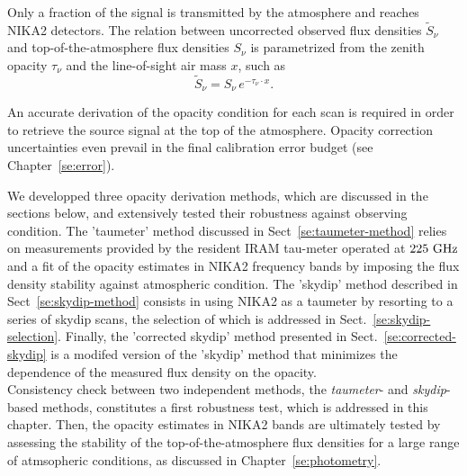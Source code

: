 %
%


Only a fraction of the signal is transmitted by the atmosphere and
reaches NIKA2 detectors. 
The relation between uncorrected observed flux densities
$\tilde{S}_{\nu}$ and top-of-the-atmosphere flux densities $S_{\nu}$
is parametrized from the zenith opacity $\tau_{\nu}$
and the line-of-sight air mass $x$, such as
\begin{equation}
\tilde{S}_{\nu} = S_{\nu} \, e^{-\tau_{\nu} \cdot x}.
\end{equation}

An accurate derivation of the opacity condition for each scan is
required in order to retrieve the source signal at the top of the
atmosphere. Opacity correction uncertainties even prevail in the
final calibration error budget (see Chapter~\ref{se:error}).

We developped three opacity derivation methods, which are discussed
in the sections below, and extensively tested their robustness against
observing condition. The 'taumeter' method discussed in
Sect~\ref{se:taumeter-method} relies on measurements provided by the
resident IRAM tau-meter operated at $225~\rm{GHz}$ and a fit of the
opacity estimates in NIKA2 frequency bands by imposing the flux
density stability against atmospheric condition. The 'skydip' method
described in Sect~\ref{se:skydip-method} consists in using NIKA2 as a
taumeter by resorting to a series of skydip scans, the selection of
which is addressed in Sect.~\ref{se:skydip-selection}. Finally, the
'corrected skydip' method presented in Sect.~\ref{se:corrected-skydip}
is a modifed version of the 'skydip' method that minimizes the
dependence of the measured flux density on the opacity.\\


Consistency check between two independent methods, the \emph{taumeter}-
and \emph{skydip}-based methods, constitutes a first
robustness test, which is addressed in this chapter.
Then, the opacity estimates in NIKA2 bands are
ultimately tested by assessing the stability of the
top-of-the-atmosphere flux densities for a large range of
atmsopheric conditions, as discussed in Chapter~\ref{se:photometry}.



